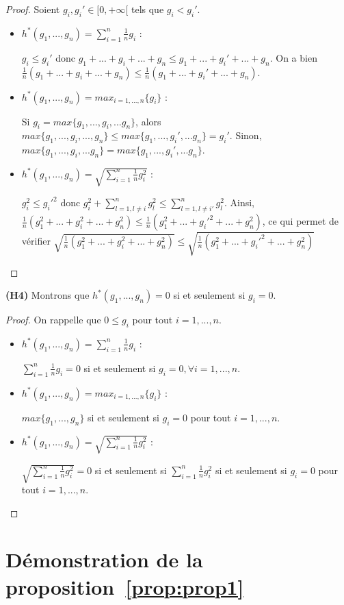 \documentclass[a4paper]{article}
\newcommand{\propref}[1]{proposition~\ref{#1}}
\begin{document}
\begin{proof}
    Soient $g_i, g_i' \in [0,+\infty[$ tels que $g_i < g_i'$. \\
    \begin{itemize}
    
        \item $h^*(g_1,...,g_n) = \sum_{i=1}^{n} \frac{1}{n} g_i$ :

            $g_i \leq g_i'$ donc $g_1+...+g_i+...+ g_n \leq g_1+...+
            g_i'+...+g_n$. On a bien $\frac{1}{n}(g_1+...+g_i+...+g_n) \leq
            \frac{1}{n}(g_1+...+g_i'+...+g_n)$.

        \item $h^*(g_1,...,g_n) = max_{i=1,...,n} \{g_i\}$ :

            Si $g_i = max \{g_1,...,g_i,...g_n\}$, alors $max
            \{g_1,...,g_i,...,g_n\} \leq max \{g_1,...,g_i',...g_n\} = g_i'$.
            Sinon, $max \{g_1,...,g_i,...g_n\} = max \{g_1,...,g_i',...g_n\}$.

        \item $h^*(g_1,...,g_n) = \sqrt{\sum_{i=1}^{n} \frac{1}{n} g_i^2}$ :

            $g_i^2 \leq g_i'^2$ donc $g_i^2 + \sum_{l=1,l \neq i}^{n} g_l^2 \leq
            \sum_{l=1,l \neq i'}^{n} g_l^2$. Ainsi,
            $\frac{1}{n}(g_1^2+...+g_i^2+...+g_n^2) \leq
            \frac{1}{n}(g_1^2+...+g_i'^2+...+g_n^2)$, ce qui permet de vérifier
            $\sqrt{\frac{1}{n}(g_1^2+...+g_i^2+...+g_n^2)} \leq
            \sqrt{\frac{1}{n}(g_1^2+...+g_i'^2+...+g_n^2)} $

    \end{itemize}
\end{proof}

\textbf{(H4)} Montrons que $h^*(g_1,...,g_n) = 0$ si et seulement si $g_i = 0$.

\begin{proof}
    On rappelle que $0 \leq g_i$ pour tout $i=1,...,n$.
    \begin{itemize}
        \item $h^*(g_1,...,g_n) = \sum_{i=1}^{n} \frac{1}{n} g_i$ :
            
            $\sum_{i=1}^{n} \frac{1}{n} g_i = 0$ si et seulement si $g_i=0,
            \forall i=1,...,n$.

        \item $h^*(g_1,...,g_n) = max_{i=1,...,n} \{g_i\}$ :

            $max \{g_1,...,g_n\}$ si et seulement si $g_i=0$ pour tout
            $i=1,...,n$. 

        \item $h^*(g_1,...,g_n) = \sqrt{\sum_{i=1}^{n} \frac{1}{n} g_i^2}$ :

            $\sqrt{\sum_{i=1}^{n} \frac{1}{n} g_i^2} = 0$ si et seulement si
            $\sum_{i=1}^{n} \frac{1}{n} g_i^2$ si et seulement si $g_i=0$ pour
            tout $i=1,...,n$.

    \end{itemize}
\end{proof}

\section{Démonstration de la \propref{prop:prop1}}

\printbibliography 
\end{document}

